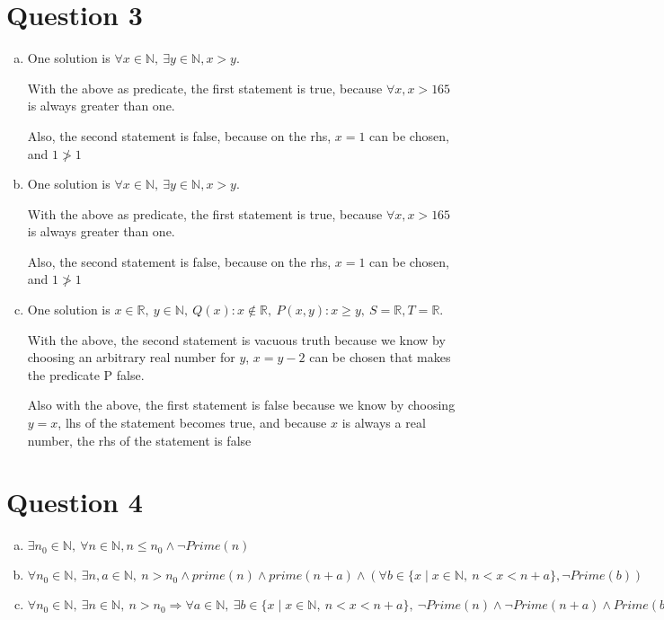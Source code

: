 \documentclass[12pt]{article}
\begin{document}
\section*{Question 3}
\begin{enumerate}[a.]
    \item

    One solution is $\forall x \in \mathbb{N},\:\exists y \in \mathbb{N}, x > y$.

    With the above as predicate, the first statement is true, because $\forall x, x > 165$ is
    always greater than one.

    Also, the second statement is false, because on the rhs, $x = 1$ can be chosen, and $1 \ngtr 1$

    \item

    One solution is $\forall x \in \mathbb{N},\:\exists y \in \mathbb{N}, x > y$.

    With the above as predicate, the first statement is true, because $\forall x, x > 165$ is
    always greater than one.

    Also, the second statement is false, because on the rhs, $x = 1$ can be chosen, and $1 \ngtr 1$

    \item

    One solution is $x \in \mathbb{R},\: y \in \mathbb{N},\:Q(x): x \notin \mathbb{R},\:P(x,y): x \geq y,\:S = \mathbb{R}, T = \mathbb{R}$.

    With the above, the second statement is vacuous truth because we know by choosing an arbitrary real number for $y$,
    $x = y - 2$ can be chosen that makes the predicate P false.

    Also with the above, the first statement is false because we know by choosing $y = x$,
    lhs of the statement becomes true, and because $x$ is always a real number, the rhs of the statement is false


\end{enumerate}

\section*{Question 4}
\begin{enumerate}[a.]
    \item

    $\exists n_0 \in \mathbb{N},\: \forall n \in \mathbb{N}, n \leq n_0 \land \neg Prime(n)$

    \item

    $\forall n_0 \in \mathbb{N},\:\exists n,a \in \mathbb{N},\:n > n_0 \land prime(n) \land prime(n+a) \land (\forall b \in \{x \mid x \in \mathbb{N},\: n<x<n+a\}, \neg Prime(b))$

    \item

    $\forall n_0 \in \mathbb{N},\: \exists n \in \mathbb{N},\: n > n_0 \Rightarrow \forall a \in \mathbb{N},\:\exists b \in \{x \mid x \in \mathbb{N},\: n<x<n+a\},\:\neg Prime(n) \land \neg Prime(n+a) \land Prime(b)$


\end{enumerate}
\end{document}
